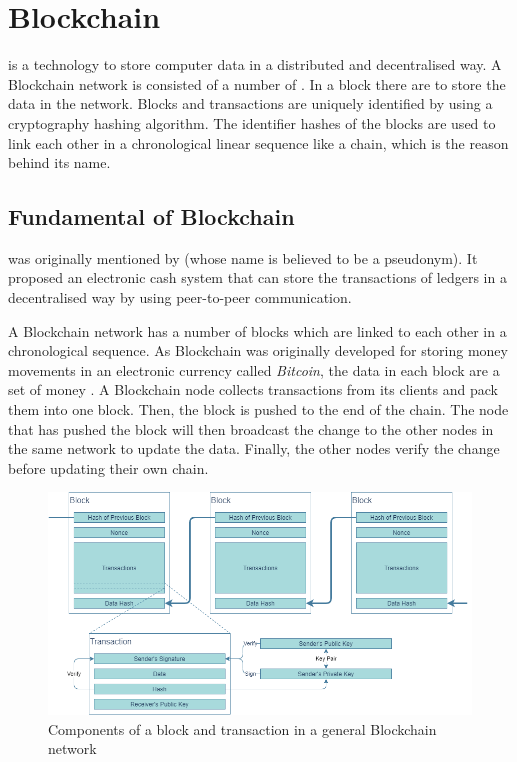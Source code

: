 
\section{Blockchain} \label{Background-Blockchain}

\npara {} is a technology to store computer data in a distributed and decentralised way.
A Blockchain network is consisted of a number of .
In a block there are  to store the data in the network.
Blocks and transactions are uniquely identified by using a cryptography hashing algorithm.
The identifier hashes of the blocks are used to link each other in a chronological linear sequence like a chain, which is the reason behind its name.

\subsection{Fundamental of Blockchain} \label{Background-Blockchain-Fundamental}

\npara {} was originally mentioned by \cite{Bitcoin} (whose name is believed to be a pseudonym).
It proposed an electronic cash system that can store the transactions of ledgers in a decentralised way by using peer-to-peer communication.

\npara A Blockchain network has a number of blocks which are linked to each other in a chronological sequence.
As Blockchain was originally developed for storing money movements in an electronic currency called \textit{Bitcoin}, the data in each block are a set of money .
A Blockchain node collects transactions from its clients and pack them into one block.
Then, the block is pushed to the end of the chain.
The node that has pushed the block will then broadcast the change to the other nodes in the same network to update the data.
Finally, the other nodes verify the change before updating their own chain.

\begin{figure}[htb!]
    \centering
    \includegraphics[width=\textwidth]{images/BackgroundBlockchain.png}
    \caption{Components of a block and transaction in a general Blockchain network}
    \label{fig:BackgroundBlockchain}
\end{figure}

